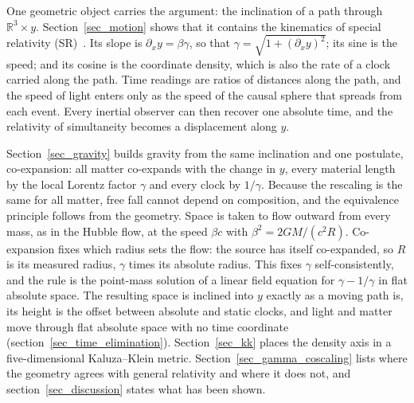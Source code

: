 \documentclass{iopjournal}
\begin{document}
One geometric object carries the argument: the inclination of a path through $\mathbb{R}^3\times y$. Section~\ref{sec_motion} shows that it contains the kinematics of special relativity (SR)~\cite{einstein1905electrodynamics}. Its slope is $\partial_x y=\beta\gamma$, so that $\gamma=\sqrt{1+(\partial_x y)^2}$; its sine is the speed; and its cosine is the coordinate density, which is also the rate of a clock carried along the path. Time readings are ratios of distances along the path, and the speed of light enters only as the speed of the causal sphere that spreads from each event. Every inertial observer can then recover one absolute time, and the relativity of simultaneity becomes a displacement along $y$.

Section~\ref{sec_gravity} builds gravity from the same inclination and one postulate, co-expansion: all matter co-expands with the change in $y$, every material length by the local Lorentz factor $\gamma$ and every clock by $1/\gamma$. Because the rescaling is the same for all matter, free fall cannot depend on composition, and the equivalence principle follows from the geometry. Space is taken to flow outward from every mass, as in the Hubble flow, at the speed $\beta c$ with $\beta^2=2GM/(c^2R)$. Co-expansion fixes which radius sets the flow: the source has itself co-expanded, so $R$ is its measured radius, $\gamma$ times its absolute radius. This fixes $\gamma$ self-consistently, and the rule is the point-mass solution of a linear field equation for $\gamma-1/\gamma$ in flat absolute space. The resulting space is inclined into $y$ exactly as a moving path is, its height is the offset between absolute and static clocks, and light and matter move through flat absolute space with no time coordinate (section~\ref{sec_time_elimination}). Section~\ref{sec_kk} places the density axis in a five-dimensional Kaluza--Klein metric. Section~\ref{sec_gamma_coscaling} lists where the geometry agrees with general relativity and where it does not, and section~\ref{sec_discussion} states what has been shown.
\end{document}
